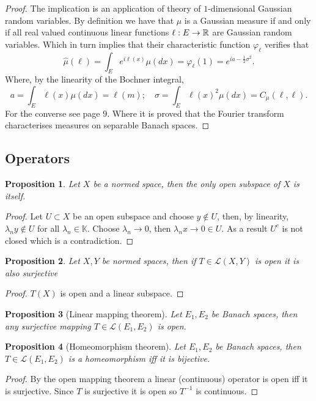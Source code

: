\documentclass[12pt]{article}
\newtheorem{proposition}{Proposition}
\begin{document}
\begin{proof}
	The implication is an application of theory of $1$-dimensional Gaussian random variables. By definition we have that $\mu $  is a Gaussian measure if and only if all real valued continuous linear functions $\ell:E\to {\mathbb R}$ are Gaussian random variables. Which in turn implies that their characteristic function $\varphi_\ell $ verifies that
	\begin{equation*}
		\hat{\mu }(\ell )=\int_{E} e^{i\ell (x)} \mu (dx)=\varphi_{\ell}(1)=e^{ia -\frac{1}{2}\sigma^2} .
	\end{equation*}
	Where, by the linearity of the Bochner integral,
	\begin{equation*}
		a       =\int_{E}\ell(x)\mu(dx)=\ell(m);\quad
		\sigma  =\int_{E}\ell(x)^2\mu(dx)=C_\mu (\ell ,\ell).
	\end{equation*}
	For the converse see \cite{hairer2009introduction} page $9$. Where it is proved that the Fourier transform characterises measures on separable Banach spaces.
\end{proof}




\subsection{Operators}
\begin{proposition}
	Let $X$ be a normed space, then the only open subspace of $X$ is itself.
\end{proposition}
\begin{proof}
	Let $U\subset X$ be an open subspace and choose $y\notin U$, then, by linearity, $\lambda_n y\notin U$ for all $\lambda_n\in\mathbb{K}$. Choose $\lambda_n\to 0$, then $\lambda_n x\to 0 \in U$. As a result $U^c$ is not closed which is a contradiction.
\end{proof}
\begin{proposition}
	Let $X, Y$ be normed spaces, then if $T\in\mathcal{L}(X,Y)$ is open it is also surjective
\end{proposition}
\begin{proof}
	$T(X)$ is open and a linear subspace.
\end{proof}
\begin{proposition}[Linear mapping theorem]
	Let $E_1,E_2$ be Banach spaces, then any surjective mapping $T\in\mathcal{L}(E_1,E_2)$ is open.
\end{proposition}
\begin{proposition}[Homeomorphism theorem]
	Let $E_1,E_2$ be Banach spaces, then $T\in\mathcal{L}(E_1,E_2)$ is a homeomorphism iff it is bijective.
\end{proposition}
\begin{proof}
	By the open mapping theorem a linear (continuous) operator is open iff it is surjective. Since $T$ is surjective it is open so $T^{-1}$ is continuous.
\end{proof}
\end{document}
